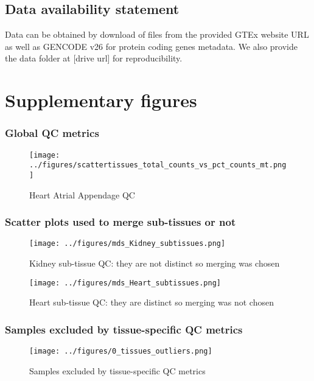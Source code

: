 \documentclass{article}
\begin{document}
\subsection{Data availability statement}
Data can be obtained by download of files from the provided GTEx website URL as well as GENCODE v26 for protein coding genes metadata. We also provide the data folder at [drive url] for reproducibility.

\section{Supplementary figures}

\FloatBarrier
\subsubsection{Global QC metrics}
\begin{figure}[htbp]
  \centering
  \texttt{[image: ../figures/scattertissues\_total\_counts\_vs\_pct\_counts\_mt.png]}
  \caption{Heart Atrial Appendage QC}
  \label{fig:scattertissues_total_counts_vs_pct_counts_mt}
\end{figure}

\FloatBarrier
\subsubsection{Scatter plots used to merge sub-tissues or not}

\begin{figure}[htbp]
  \centering
  \texttt{[image: ../figures/mds\_Kidney\_subtissues.png]}
  \caption{Kidney sub-tissue QC: they are not distinct so merging was chosen}
  \label{fig:kidney_merging}
\end{figure}

\begin{figure}[htbp]
  \centering
  \texttt{[image: ../figures/mds\_Heart\_subtissues.png]}
  \caption{Heart sub-tissue QC: they are distinct so merging was not chosen}
  \label{fig:heart_merging}
\end{figure}


\FloatBarrier
\subsubsection{Samples excluded by tissue-specific QC metrics}

\begin{figure}[htbp]
  \centering
  \texttt{[image: ../figures/0\_tissues\_outliers.png]}
  \caption{Samples excluded by tissue-specific QC metrics}
  \label{fig:0_tissues_outliers}
\end{figure}
\end{document}
